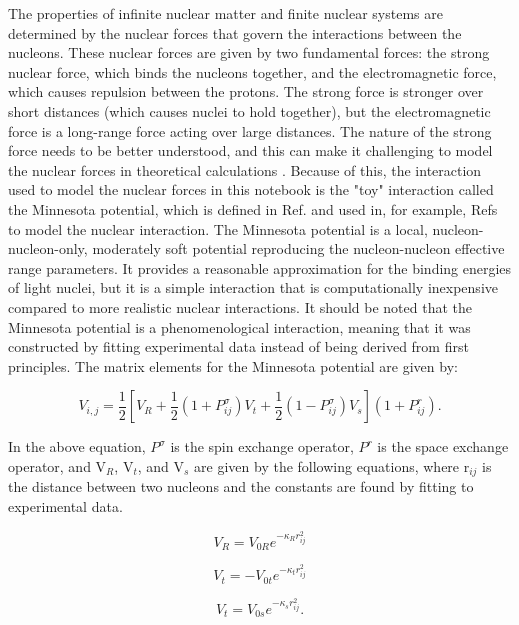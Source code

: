 The properties of infinite nuclear matter and finite nuclear systems are determined by the nuclear forces that govern the interactions between the nucleons. These nuclear forces are given by two fundamental forces: the strong nuclear force, which binds the nucleons together, and the electromagnetic force, which causes repulsion between the protons. The strong force is stronger over short distances (which causes nuclei to hold together), but the electromagnetic force is a long-range force acting over large distances. The nature of the strong force needs to be better understood, and this can make it challenging to model the nuclear forces in theoretical calculations \cite{Ref200, Ref201}. Because of this, the interaction used to model the nuclear forces in this notebook is the "toy" interaction called the Minnesota potential, which is defined in Ref. \cite{Ref166} and used in, for example, Refs \cite{Ref3, Ref5, Ref167} to model the nuclear interaction. The Minnesota potential is a local, nucleon-nucleon-only, moderately soft potential reproducing the nucleon-nucleon effective range parameters. It provides a reasonable approximation for the binding energies of light nuclei, but it is a simple interaction that is computationally inexpensive compared to more realistic nuclear interactions. It should be noted that the Minnesota potential is a phenomenological interaction, meaning that it was constructed by fitting experimental data instead of being derived from first principles. The matrix elements for the Minnesota potential are given by:

$$V_{i,j} = \frac{1}{2}[V_R + \frac{1}{2}(1+P^\sigma_{ij})V_t + \frac{1}{2}(1-P^\sigma_{ij})V_s](1+P^r_{ij}).$$

In the above equation, $P^\sigma$ is the spin exchange operator, $P^r$ is the space exchange operator, and V$_R$, V$_t$, and V$_s$ are given by the following equations, where r$_{ij}$ is the distance between two nucleons and the constants are found by fitting to experimental data.

$$V_R = V_{0R}e^{-\kappa_Rr_{ij}^2}$$

$$V_t = -V_{0t}e^{-\kappa_tr_{ij}^2}$$

$$V_t = V_{0s}e^{-\kappa_sr_{ij}^2}.$$

